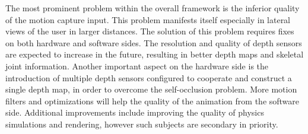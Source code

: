 The most prominent problem within the overall framework is the inferior quality of the motion capture input. This problem manifests itself especially in lateral views of the user in larger distances. The solution of this problem requires fixes on both hardware and software sides. The resolution and quality of depth sensors are expected to increase in the future, resulting in better depth maps and skeletal joint information. Another important aspect on the hardware side is the introduction of multiple depth sensors configured to cooperate and construct a single depth map, in order to overcome the self-occlusion problem. More motion filters and optimizations will help the quality of the animation from the software side. Additional improvements include improving the quality of physics simulations and rendering, however such subjects are secondary in priority.  

